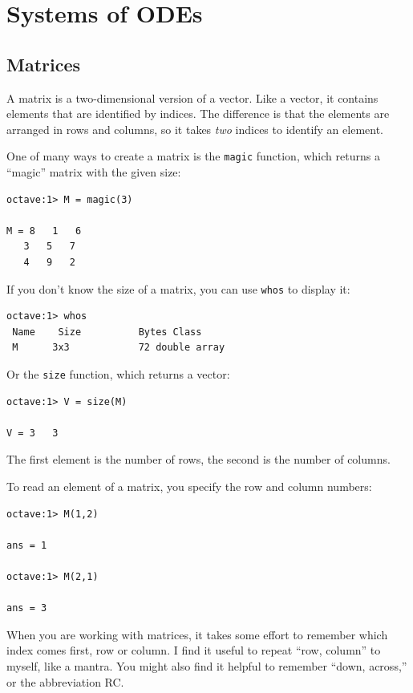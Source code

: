 \documentclass{book}
\begin{document}
\chapter{Systems of ODEs}

\section{Matrices}

A matrix is a two-dimensional version of a vector. Like a vector,
it contains elements that are identified by indices. The difference
is that the elements are arranged in rows and columns, so it takes
{\em two} indices to identify an element.

One of many ways to create a matrix is the {\tt magic} function,
which returns a ``magic'' matrix with the given size:

\begin{verbatim}
octave:1> M = magic(3)

M = 8   1   6
   3   5   7
   4   9   2
\end{verbatim}

If you don't know the size of a matrix, you can use {\tt whos} to
display it:

\begin{verbatim}
octave:1> whos
 Name    Size          Bytes Class
 M      3x3            72 double array
\end{verbatim}

Or the {\tt size} function, which returns a vector:

\begin{verbatim}
octave:1> V = size(M)

V = 3   3
\end{verbatim}

The first element is the number of rows, the second is the number of
columns.

To read an element of a matrix, you specify the row and column numbers:

\begin{verbatim}
octave:1> M(1,2)

ans = 1

octave:1> M(2,1)

ans = 3
\end{verbatim}

When you are working with matrices, it takes some effort to remember
which index comes first, row or column. I find it useful to repeat
``row, column'' to myself, like a mantra. You might also find it
helpful to remember ``down, across,'' or the abbreviation RC.
\end{document}
